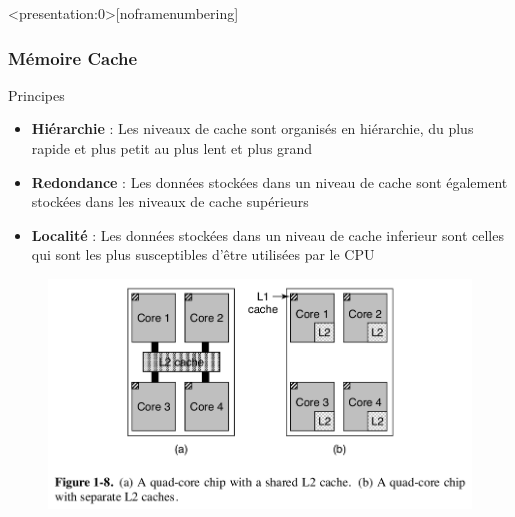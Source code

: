 \documentclass[8pt]{beamer}
\begin{document}
\begin{frame}<presentation:0>[noframenumbering]
    \frametitle{Mémoire Cache}
    \begin{block}{Principes}
        \begin{itemize}
            \item \textbf{Hiérarchie} : Les niveaux de cache sont organisés en
                  hiérarchie, du plus rapide et plus petit au plus lent et plus
                  grand
            \item \textbf{Redondance} : Les données stockées dans un niveau de
                  cache
                  sont également stockées dans les niveaux de cache supérieurs
            \item \textbf{Localité} : Les données stockées dans un niveau de
                  cache
                  inferieur sont celles qui sont les plus susceptibles d'être
                  utilisées par le CPU
        \end{itemize}
    \end{block}
    \begin{figure}
        \centering
        \includegraphics[width=.6\textwidth]{figures/ProcCoresCache_T.png}
    \end{figure}

\end{frame}
\end{document}
